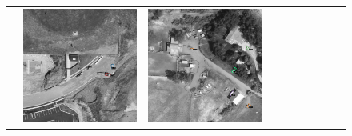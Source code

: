 \begin{figure}[h!]
\begin{tabularx}{\textwidth}{c|*{9}{X}}
    & \includegraphics[trim={440pt 360pt 460pt 555pt},clip,width=\linewidth]{images/015Results/03ablation/comp_images/red/427.png}
    & \includegraphics[trim={740pt 420pt 180pt 510pt},clip,width=\linewidth]{images/015Results/03ablation/comp_images/red/523.png}

\end{tabularx}
\end{figure}
